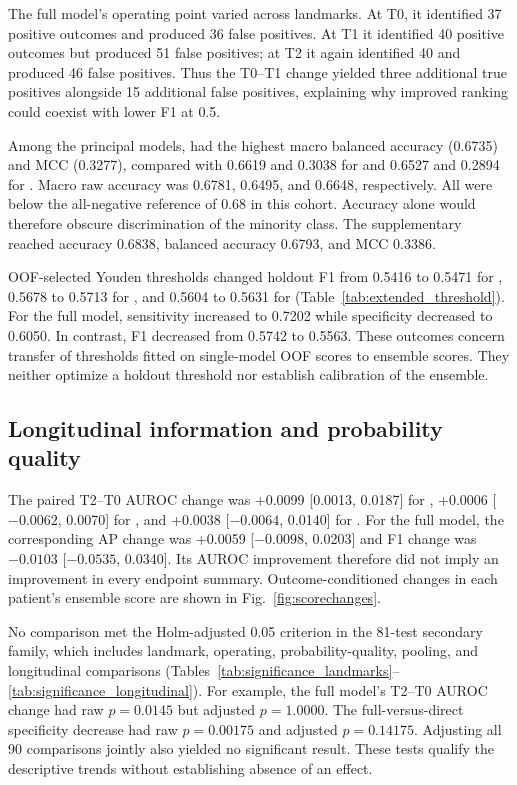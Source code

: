 The full model's operating point varied across landmarks. At T0, it identified 37 positive outcomes and produced 36 false positives. At T1 it identified 40 positive outcomes but produced 51 false positives; at T2 it again identified 40 and produced 46 false positives. Thus the T0--T1 change yielded three additional true positives alongside 15 additional false positives, explaining why improved ranking could coexist with lower F1 at 0.5.

Among the principal models, \direct{} had the highest macro balanced accuracy (0.6735) and MCC (0.3277), compared with 0.6619 and 0.3038 for \fullmodel{} and 0.6527 and 0.2894 for \nojepa{}. Macro raw accuracy was 0.6781, 0.6495, and 0.6648, respectively. All were below the all-negative reference of 0.68 in this cohort. Accuracy alone would therefore obscure discrimination of the minority class. The supplementary \meanmodel{} reached accuracy 0.6838, balanced accuracy 0.6793, and MCC 0.3386.

OOF-selected Youden thresholds changed holdout F1 from 0.5416 to 0.5471 for \nojepa{}, 0.5678 to 0.5713 for \direct{}, and 0.5604 to 0.5631 for \fullmodel{} (Table~\ref{tab:extended_threshold}). For the full model, sensitivity increased to 0.7202 while specificity decreased to 0.6050. In contrast, \meanmodel{} F1 decreased from 0.5742 to 0.5563. These outcomes concern transfer of thresholds fitted on single-model OOF scores to ensemble scores. They neither optimize a holdout threshold nor establish calibration of the ensemble.

\subsection{Longitudinal information and probability quality}
The paired T2--T0 AUROC change was +0.0099 [0.0013, 0.0187] for \fullmodel{}, +0.0006 [$-0.0062$, 0.0070] for \nojepa{}, and +0.0038 [$-0.0064$, 0.0140] for \direct{}. For the full model, the corresponding AP change was +0.0059 [$-0.0098$, 0.0203] and F1 change was $-0.0103$ [$-0.0535$, 0.0340]. Its AUROC improvement therefore did not imply an improvement in every endpoint summary. Outcome-conditioned changes in each patient's ensemble score are shown in Fig.~\ref{fig:scorechanges}.

No comparison met the Holm-adjusted 0.05 criterion in the 81-test secondary family, which includes landmark, operating, probability-quality, pooling, and longitudinal comparisons (Tables~\ref{tab:significance_landmarks}--\ref{tab:significance_longitudinal}). For example, the full model's T2--T0 AUROC change had raw $p=0.0145$ but adjusted $p=1.0000$. The full-versus-direct specificity decrease had raw $p=0.00175$ and adjusted $p=0.14175$. Adjusting all 90 comparisons jointly also yielded no significant result. These tests qualify the descriptive trends without establishing absence of an effect.

